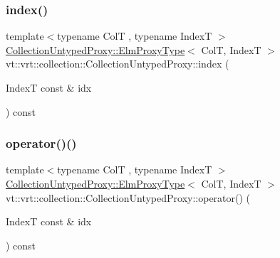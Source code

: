 \mbox{\label{structvt_1_1vrt_1_1collection_1_1_collection_untyped_proxy_a374fa73d81e8cf2fff9f2b9a494db3c8}} 
\subsubsection{\texorpdfstring{index()}{index()}}
{\footnotesize\ttfamily template$<$typename ColT , typename IndexT $>$ \\
\hyperlink{structvt_1_1vrt_1_1collection_1_1_collection_untyped_proxy_abf73984f3a31218515f9f4806f41cef5}{Collection\+Untyped\+Proxy\+::\+Elm\+Proxy\+Type}$<$ ColT, IndexT $>$ vt\+::vrt\+::collection\+::\+Collection\+Untyped\+Proxy\+::index (\begin{DoxyParamCaption}\item[{IndexT const \&}]{idx }\end{DoxyParamCaption}) const}

\mbox{\label{structvt_1_1vrt_1_1collection_1_1_collection_untyped_proxy_a4db7a90e93f3e3a65544c6d947e0985d}} 
\subsubsection{\texorpdfstring{operator()()}{operator()()}}
{\footnotesize\ttfamily template$<$typename ColT , typename IndexT $>$ \\
\hyperlink{structvt_1_1vrt_1_1collection_1_1_collection_untyped_proxy_abf73984f3a31218515f9f4806f41cef5}{Collection\+Untyped\+Proxy\+::\+Elm\+Proxy\+Type}$<$ ColT, IndexT $>$ vt\+::vrt\+::collection\+::\+Collection\+Untyped\+Proxy\+::operator() (\begin{DoxyParamCaption}\item[{IndexT const \&}]{idx }\end{DoxyParamCaption}) const}

